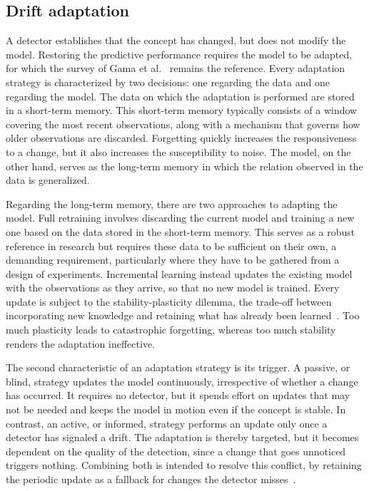 \subsection{Drift adaptation} \label{subsec:adaptation}
%
A detector establishes that the concept has changed, but does not modify the model. Restoring the predictive performance requires the model to be adapted, for which the survey of Gama et al.~\cite{gama.2014} remains the reference. Every adaptation strategy is characterized by two decisions: one regarding the data and one regarding the model. The data on which the adaptation is performed are stored in a short-term memory. This short-term memory typically consists of a window covering the most recent observations, along with a mechanism that governs how older observations are discarded. Forgetting quickly increases the responsiveness to a change, but it also increases the susceptibility to noise. The model, on the other hand, serves as the long-term memory in which the relation observed in the data is generalized. \par
%
Regarding the long-term memory, there are two approaches to adapting the model. Full retraining involves discarding the current model and training a new one based on the data stored in the short-term memory. This serves as a robust reference in research but requires these data to be sufficient on their own, a demanding requirement, particularly where they have to be gathered from a design of experiments. Incremental learning instead updates the existing model with the observations as they arrive, so that no new model is trained. Every update is subject to the stability-plasticity dilemma, the trade-off between incorporating new knowledge and retaining what has already been learned~\cite{gama.2014}. Too much plasticity leads to catastrophic forgetting, whereas too much stability renders the adaptation ineffective. \par
%
The second characteristic of an adaptation strategy is its trigger. A passive, or blind, strategy updates the model continuously, irrespective of whether a change has occurred. It requires no detector, but it spends effort on updates that may not be needed and keeps the model in motion even if the concept is stable. In contrast, an active, or informed, strategy performs an update only once a detector has signaled a drift. The adaptation is thereby targeted, but it becomes dependent on the quality of the detection, since a change that goes unnoticed triggers nothing. Combining both is intended to resolve this conflict, by retaining the periodic update as a fallback for changes the detector misses~\cite{gama.2014}. \par
%

